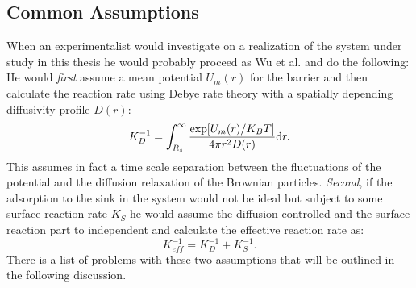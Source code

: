 \subsection{Common Assumptions}
When an experimentalist would investigate on a realization of the system under study in this thesis he would probably proceed as Wu et al. \cite{Wu2012a} and do the following: \\ 
He would \emph{first} assume a mean potential $U_m(r)$ for the barrier and then calculate the reaction rate using Debye rate theory with a spatially depending diffusivity profile $D(r)$:
\begin{equation}
    K_D^{-1} = \int_{R_s}^{\infty}\frac{\exp[U_m(r)/K_B T]}{4 \pi r^{2} D(r)} {\rm d} r.
    \label{YSDebye}
\end{equation}
This assumes in fact a time scale separation between the fluctuations of the potential and the diffusion relaxation of the Brownian particles.
\emph{Second}, if the adsorption to the sink in the system would not be ideal but subject to some surface reaction rate $K_S$ he would assume the diffusion controlled and the surface reaction part to independent and calculate the effective reaction rate as:
\begin{equation}
    K_{eff}^{-1} = K_D^{-1} + K_S^{-1}.
    \label{Keff}
\end{equation}
There is a list of problems with these two assumptions that will be outlined in the following discussion. \\
